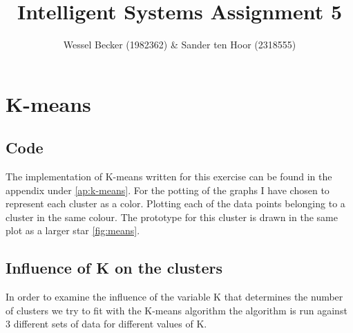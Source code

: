 \documentclass[10pt,a4paper]{article}
\begin{document}
\title{Intelligent Systems Assignment 5}
\author{Wessel Becker (1982362) \& Sander ten Hoor (2318555)}
\maketitle

\newcommand{\simplesubfigure}[3]{
  \noindent\begin{minipage}{.31\linewidth}
    \begin{center}
      \texttt{[image: \#1]}
      \captionof{figure}{#2}
      \label{#3}
    \end{center}
  \end{minipage}\hspace{7pt}
}
\newcommand{\simplefigure}[3]{
	\noindent\begin{figure}[H]
  	\centering
    	\makebox[.6\textwidth]
    	{
    		\texttt{[image: \#1]}
 		} \\
  		\caption{#2}
  		\label{#3}
	\end{figure}
}
\newcommand{\mcode}[2]{
	\label{#2}
}

\section{K-means}	
\subsection{Code}
The implementation of K-means written for this exercise can be found in the appendix under \autoref{ap:k-means}. 
For the potting of the graphs I have chosen to represent each cluster as a color. Plotting each of the data points belonging to a cluster in the same colour. The prototype for this cluster is drawn in the same plot as a larger star \autoref{fig:means}.
\subsection{Influence of K on the clusters}
In order to examine the influence of the variable K that determines the number of clusters we try to fit with the K-means algorithm the algorithm is run against 3 different sets of data for different values of K.
\end{document}
